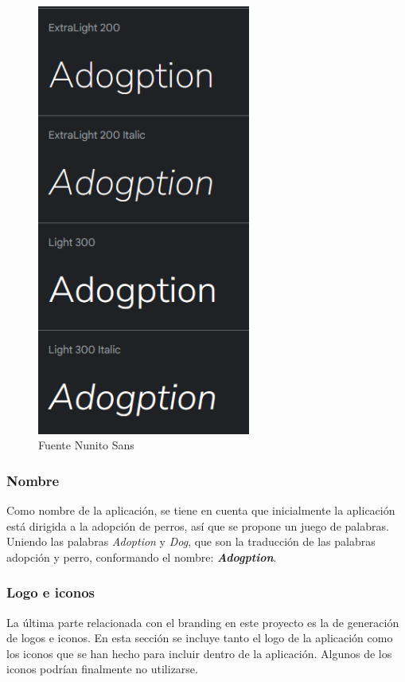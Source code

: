 \documentclass[a4paper, 12pt]{article}
\begin{document}
\begin{figure}[H]
	\begin{center}
		{\includegraphics[width=7cm]{design/NunitoFont.png}\par}
		\caption{Fuente Nunito Sans}
	\end{center}
\end{figure}

\subsubsection{Nombre}

Como nombre de la aplicación,  se tiene en cuenta que inicialmente la aplicación está dirigida a la adopción de perros, así que se propone un juego de palabras. Uniendo las palabras \textit{Adoption} y \textit{Dog}, que son la traducción de las palabras adopción y perro, conformando el nombre: \textbf{\textit{Adogption}}.

\subsubsection{Logo e iconos}

La última parte relacionada con el branding en este proyecto es la de generación de logos e iconos. En esta sección se incluye tanto el logo de la aplicación como los iconos que se han hecho para incluir dentro de la aplicación. Algunos de los iconos podrían finalmente no utilizarse.
\end{document}
